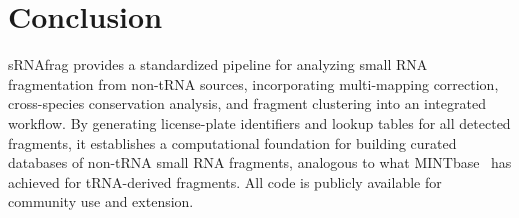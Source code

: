 \documentclass[11pt]{article}
\begin{document}
\section{Conclusion}

sRNAfrag provides a standardized pipeline for analyzing small RNA fragmentation from non-tRNA sources, incorporating multi-mapping correction, cross-species conservation analysis, and fragment clustering into an integrated workflow.  By generating license-plate identifiers and lookup tables for all detected fragments, it establishes a computational foundation for building curated databases of non-tRNA small RNA fragments, analogous to what MINTbase~\citep{loher2017mintbase} has achieved for tRNA-derived fragments.  All code is publicly available for community use and extension.



\end{document}
